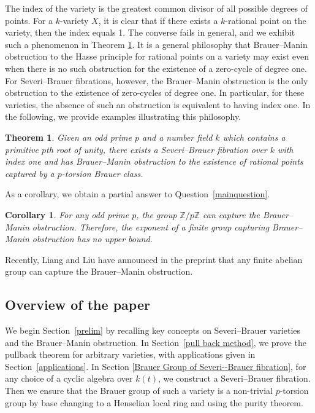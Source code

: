 \documentclass[11pt]{amsart}
\theoremstyle{plain}
\newtheorem{theorem}[thm]{Theorem}
\newtheorem{corollary}[thm]{Corollary}
\theoremstyle{definition}
\newcommand{\Z}{{\mathbb Z}}
\begin{document}
The index of the variety is the greatest common divisor of all possible degrees of points. For a $k$-variety \(X\), it is clear that if there exists a $k$-rational point on the variety, then the index equals 1. The converse fails in general, and we exhibit such a phenomenon in Theorem \ref{main}.
   It is a general philosophy that Brauer--Manin obstruction to the Hasse principle for rational points on a variety may exist even when there is no such obstruction for the existence of a zero-cycle of degree one. For Severi--Brauer fibrations, however, the Brauer--Manin obstruction is the only obstruction to the existence of zero-cycles of degree one. In particular, for these varieties, the absence of such an obstruction is equivalent to having index one. In the following, we provide examples illustrating this philosophy.
	
\begin{theorem}\label{main}
Given an odd prime $p$ and a number field $k$ which contains a primitive $p$th root of unity, there exists a Severi--Brauer fibration over $k$ with index one and has Brauer--Manin obstruction to the existence of rational points captured by a $p$-torsion Brauer class. 
\end{theorem}


As a corollary, we obtain a partial answer to Question~\ref{mainquestion}.
    
    \begin{corollary}\label{sub of main}
         For any odd prime $p$, the group $\Z/p\Z$ can capture the Brauer--Manin obstruction. Therefore, the exponent of a finite group capturing Brauer--Manin obstruction has no upper bound.
	\end{corollary}
    
Recently, Liang and Liu have announced in the preprint \cite{ll} that any finite abelian group can capture the Brauer--Manin obstruction.



\subsection{Overview of the paper}
We begin Section~\ref{prelim} by recalling key concepts on Severi--Brauer varieties and the Brauer--Manin obstruction. In Section~\ref{pull back method}, we prove the pullback theorem for arbitrary varieties, with applications given in Section~\ref{applications}. In Section \ref{Brauer Group of Severi--Brauer fibration}, for any choice of a cyclic algebra over $k(t)$, we construct a Severi--Brauer fibration. Then we ensure that the Brauer group of such a variety is a non-trivial $p$-torsion group by base changing to a Henselian local ring and using the purity theorem.   
\end{document}
